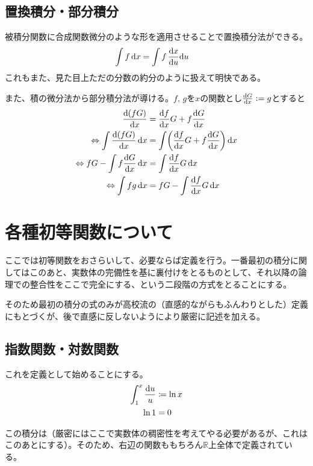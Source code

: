 \subsection{置換積分・部分積分}
被積分関数に合成関数微分のような形を適用させることで置換積分法ができる。
\begin{align}
    \int f\,\mathrm{d}x & =\int f\,\frac{\mathrm{d}x}{\mathrm{d}u}\mathrm{d}u \label{eq:1.7}
\end{align}
これもまた、見た目上ただの分数の約分のように扱えて明快である。

また、積の微分法から部分積分法が導ける。$f,\,g$を$x$の関数とし$\frac{\mathrm{d}G}{\mathrm{d}x}:=g$とすると
\begin{align}
    \begin{aligned}
        \diff{\pare{fG}}x                          & =\diff{f}xG+f\diff{G}x                 \\
        \Leftrightarrow \int\diff{\pare{fG}}x\,\dx & =\int\pare{\diff{f}xG+f\diff{G}x}\,\dx \\
        \Leftrightarrow fG-\int f\diff{G}x\,\dx    & =\int\diff{f}xG\,\dx                   \\
        \Leftrightarrow \int fg\,\dx               & =fG-\int\diff{f}xG\,\dx
    \end{aligned}\label{eq:1.8}
\end{align}
\clearpage
\section{各種初等関数について}
ここでは初等関数をおさらいして、必要ならば定義を行う。一番最初の積分に関してはこのあと、実数体の完備性を基に裏付けをとるものとして、それ以降の論理での整合性をここで完全にする、という二段階の方式をとることにする。

そのため最初の積分の式のみが高校流の（直感的ながらもふんわりとした）定義にもとづくが、後で直感に反しないようにより厳密に記述を加える。
\subsection{指数関数・対数関数}
これを定義として始めることにする。
\begin{align}
    \begin{aligned}
        \int_1^x \frac{\mathrm{d}u}u & \coloneqq\ln x \\
        \ln 1                & =0
    \end{aligned}\label{eq:1.9}
\end{align}

この積分は（厳密にはここで実数体の稠密性を考えてやる必要があるが、これはこのあとにする）。そのため、右辺の関数ももちろん$\mathbb{R}$上全体で定義されている。

